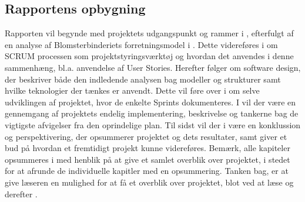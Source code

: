\subsection{Rapportens opbygning}
Rapporten vil begynde med projektets udgangspunkt og rammer i , efterfulgt af en analyse af Blomsterbinderiets forretningsmodel i . 
Dette videreføres i  om SCRUM processen som projektstyringsværktøj og hvordan det anvendes i denne sammenhæng, bl.a. anvendelse af User Stories.
Herefter følger  om software design, der beskriver både den indledende analysen bag modeller og strukturer samt hvilke teknologier der tænkes er anvendt.
Dette vil føre over i  om selve udviklingen af projektet, hvor de enkelte Sprints dokumenteres. 
I  vil der være en gennemgang af projektets endelig implementering, beskrivelse og tankerne bag de vigtigste afvigelser fra den oprindelige plan.
Til sidst vil der i  være en konklussion og perspektivering, der opsummerer projektet og dets resultater, samt giver et bud på hvordan et fremtidigt projekt kunne videreføres.
Bemærk, alle kapiteler opsummeres i  med henblik på at give et samlet overblik over projektet, i stedet for at afrunde de individuelle kapitler med en opsummering. 
Tanken bag, er at give læseren en mulighed for at få et overblik over projektet, blot ved at læse  og derefter .

